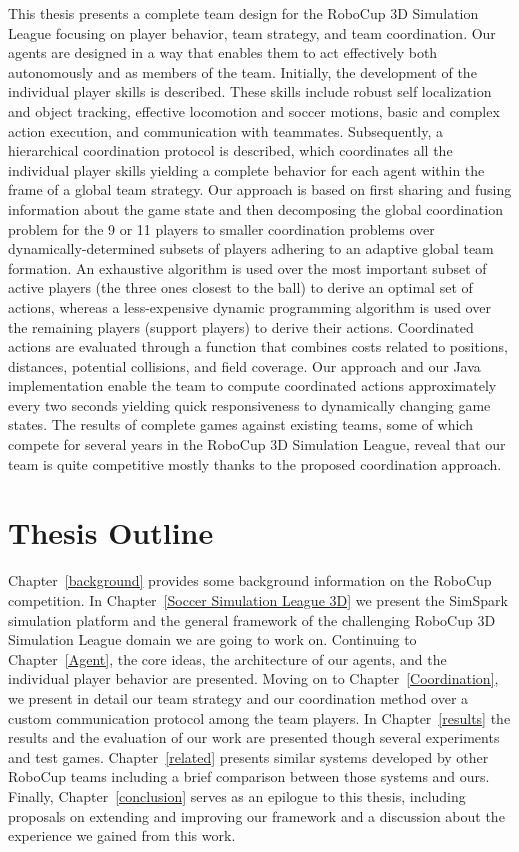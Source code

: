 This thesis presents a complete team design for the RoboCup 3D Simulation League focusing on player behavior, team strategy, and team coordination. Our agents are designed in a way that enables them to act effectively both autonomously and as members of the team. Initially, the development of the individual player skills is described. These skills include robust self localization and object tracking, effective locomotion and soccer motions, basic and complex action execution, and communication with teammates. Subsequently, a hierarchical coordination protocol is described, which coordinates all the individual player skills yielding a complete behavior for each agent within the frame of a global team strategy. Our approach is based on first sharing and fusing information about the game state and then decomposing the global coordination problem for the 9 or 11 players to smaller coordination problems over dynamically-determined subsets of players adhering to an adaptive global team formation. An exhaustive algorithm is used over the most important subset of active players (the three ones closest to the ball) to derive an optimal set of actions, whereas a less-expensive dynamic programming algorithm is used over the remaining players (support players) to derive their actions. Coordinated actions are evaluated through a function that combines costs related to positions, distances, potential collisions, and field coverage. Our approach and our Java implementation enable the team to compute coordinated actions approximately every two seconds yielding quick responsiveness to dynamically changing game states. The results of complete games against existing teams, some of which compete for several years in the RoboCup 3D Simulation League, reveal that our team is quite competitive mostly thanks to the proposed coordination approach.


\section{Thesis Outline}
Chapter~\ref{background} provides some background information on the RoboCup competition. In Chapter~\ref{Soccer Simulation League 3D} we present the SimSpark simulation platform and the general framework of the challenging RoboCup 3D Simulation League domain we are going to work on. Continuing to Chapter~\ref{Agent}, the core ideas, the architecture of our agents, and the individual player behavior are presented. Moving on to Chapter~\ref{Coordination}, we present in detail our team strategy and our coordination method over a custom communication protocol among the team players. In Chapter~\ref{results} the results and the evaluation of our work are presented though several experiments and test games. Chapter~\ref{related} presents similar systems developed by other RoboCup teams including a brief comparison between those systems and ours. Finally, Chapter~\ref{conclusion} serves as an epilogue to this thesis, including proposals on extending and improving our framework and a discussion about the experience we gained from this work. 
